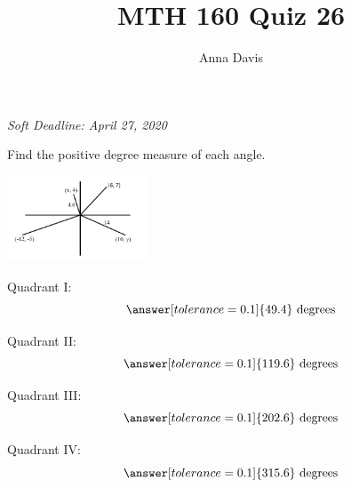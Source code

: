 \documentclass{ximera}
\author{Anna Davis} \title{MTH 160 Quiz 26}
\begin{document}
\begin{abstract}

\end{abstract}
\maketitle
 \textit{Soft Deadline: April 27, 2020}
\begin{problem}\label{prob:quiz26prob1}
Find the positive degree measure of each angle.
\begin{image}
   
\includegraphics[height=1in]{angles.jpg}~
 
\end{image}

Quadrant I:
$$\answer[tolerance=0.1]{49.4}\mbox{ degrees}$$

Quadrant II:
$$\answer[tolerance=0.1]{119.6}\mbox{ degrees}$$

Quadrant III:
$$\answer[tolerance=0.1]{202.6}\mbox{ degrees}$$

Quadrant IV:
$$\answer[tolerance=0.1]{315.6}\mbox{ degrees}$$

\end{problem}
\end{document}

